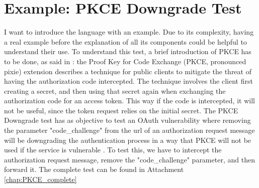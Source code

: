 \section{Example: PKCE Downgrade Test}
I want to introduce the language with an example. Due to its complexity, having a real example before the explanation of all its components could be helpful to understand their use.
To understand this test, a brief introduction of PKCE has to be done, as said in \cite{pkce_explanation}: the Proof Key for Code Exchange (PKCE, pronounced pixie) extension describes a technique for public clients to mitigate the threat of having the authorization code intercepted. The technique involves the client first creating a secret, and then using that secret again when exchanging the authorization code for an access token. This way if the code is intercepted, it will not be useful, since the token request relies on the initial secret. 
The PKCE Downgrade test has as objective to test an \Gls{OAuth} vulnerability where removing the parameter "code\_challenge" from the url of an authorization request message will be downgrading the authentication process in a way that PKCE will not be used if the service is vulnerable \cite{pkce_downgrade}. To test this, we have to intercept the authorization request message, remove the "code\_challenge" parameter, and then forward it.
The complete test can be found in Attachment \ref{chap:PKCE_complete}




